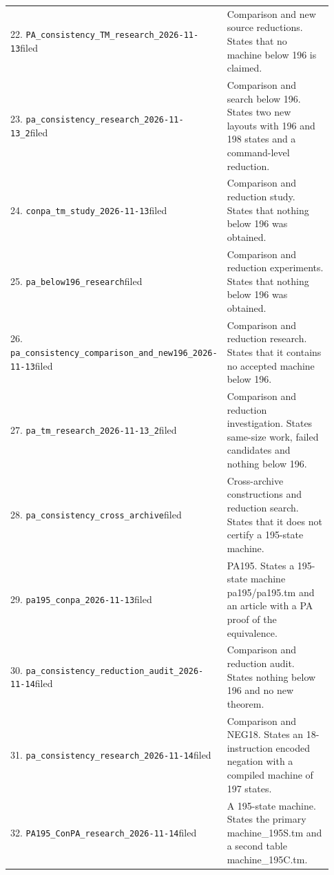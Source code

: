 {\begin{longtable}{@{}p{0.34\linewidth}p{0.59\linewidth}@{}}
22. \nolinkurl{PA_consistency_TM_research_2026-11-13}\newline filed&Comparison and new source reductions. States that no machine below 196 is claimed.\\[4pt]
23. \nolinkurl{pa_consistency_research_2026-11-13_2}\newline filed&Comparison and search below 196. States two new layouts with 196 and 198 states and a command-level reduction.\\[4pt]
24. \nolinkurl{conpa_tm_study_2026-11-13}\newline filed&Comparison and reduction study. States that nothing below 196 was obtained.\\[4pt]
25. \nolinkurl{pa_below196_research}\newline filed&Comparison and reduction experiments. States that nothing below 196 was obtained.\\[4pt]
26. \nolinkurl{pa_consistency_comparison_and_new196_2026-11-13}\newline filed&Comparison and reduction research. States that it contains no accepted machine below 196.\\[4pt]
27. \nolinkurl{pa_tm_research_2026-11-13_2}\newline filed&Comparison and reduction investigation. States same-size work, failed candidates and nothing below 196.\\[4pt]
28. \nolinkurl{pa_consistency_cross_archive}\newline filed&Cross-archive constructions and reduction search. States that it does not certify a 195-state machine.\\[4pt]
29. \nolinkurl{pa195_conpa_2026-11-13}\newline filed&PA195. States a 195-state machine pa195/pa195.tm and an article with a PA proof of the equivalence.\\[4pt]
30. \nolinkurl{pa_consistency_reduction_audit_2026-11-14}\newline filed&Comparison and reduction audit. States nothing below 196 and no new theorem.\\[4pt]
31. \nolinkurl{pa_consistency_research_2026-11-14}\newline filed&Comparison and NEG18. States an 18-instruction encoded negation with a compiled machine of 197 states.\\[4pt]
32. \nolinkurl{PA195_ConPA_research_2026-11-14}\newline filed&A 195-state machine. States the primary machine\_195S.tm and a second table machine\_195C.tm.\\[4pt]

\end{longtable}}

